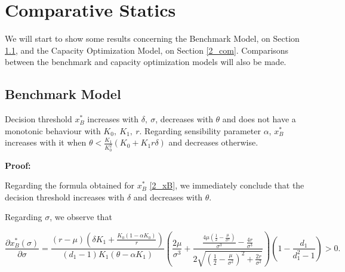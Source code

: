 
\section{Comparative Statics}
We will start to show some results concerning the Benchmark Model, on Section \ref{2_bm}, and the Capacity Optimization Model, on Section \ref{2_com}. Comparisons between the benchmark and capacity optimization models will also be made.

\subsection{Benchmark Model}
\label{2_bm}


\begin{prop}
	\label{2_prop1}
Decision threshold $x^*_B$ increases with $ \delta, \ \sigma$, decreases with $\theta$ and does not have a monotonic behaviour with $K_0, \ K_1, \ r$. Regarding sensibility parameter $\alpha$, $x_B^*$ increases with it when $\theta < \frac{K_1}{ K_0^2} (K_0+K_1 r \delta)$ and decreases otherwise.
\end{prop}

\textbf{Proof:}

Regarding the formula obtained for  $x^*_B$ \eqref{2_xB}, we immediately conclude that the decision threshold increases with $\delta$ and decreases with $\theta$.

Regarding $\sigma$, we observe that


$$    \frac{\partial x^*_B ( \sigma ) }{\partial \sigma}= 
\frac{(r-\mu )  \left(\delta  K_1+\frac{K_0(1-\alpha K_0)}{r}\right)}{(d_1-1) K_1 (\theta -\alpha  K_1)} \left(\frac{2 \mu }{\sigma ^3}+\frac{\frac{4 \mu  \left(\frac{1}{2}-\frac{\mu }{\sigma ^2}\right)}{\sigma ^3}-\frac{4 r}{\sigma ^3}}{2 \sqrt{\left(\frac{1}{2}-\frac{\mu }{\sigma ^2}\right)^2+\frac{2 r}{\sigma ^2}}}\right) \left( 1- \frac{d_1}{d_1^2-1} \right)>0.$$


